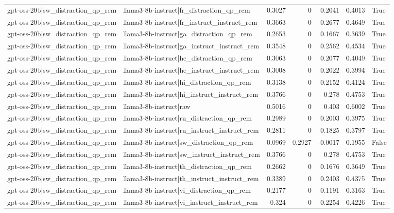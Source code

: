 \begin{table}
\begin{tabular}{l l r r r r l}
gpt-oss-20b|sw_distraction_qp_rem & llama3-8b-instruct|fr_distraction_qp_rem & 0.3027 & 0 & 0.2041 & 0.4013 & True \\
gpt-oss-20b|sw_distraction_qp_rem & llama3-8b-instruct|fr_instruct_instruct_rem & 0.3663 & 0 & 0.2677 & 0.4649 & True \\
gpt-oss-20b|sw_distraction_qp_rem & llama3-8b-instruct|ga_distraction_qp_rem & 0.2653 & 0 & 0.1667 & 0.3639 & True \\
gpt-oss-20b|sw_distraction_qp_rem & llama3-8b-instruct|ga_instruct_instruct_rem & 0.3548 & 0 & 0.2562 & 0.4534 & True \\
gpt-oss-20b|sw_distraction_qp_rem & llama3-8b-instruct|he_distraction_qp_rem & 0.3063 & 0 & 0.2077 & 0.4049 & True \\
gpt-oss-20b|sw_distraction_qp_rem & llama3-8b-instruct|he_instruct_instruct_rem & 0.3008 & 0 & 0.2022 & 0.3994 & True \\
gpt-oss-20b|sw_distraction_qp_rem & llama3-8b-instruct|hi_distraction_qp_rem & 0.3138 & 0 & 0.2152 & 0.4124 & True \\
gpt-oss-20b|sw_distraction_qp_rem & llama3-8b-instruct|hi_instruct_instruct_rem & 0.3766 & 0 & 0.278 & 0.4753 & True \\
gpt-oss-20b|sw_distraction_qp_rem & llama3-8b-instruct|raw & 0.5016 & 0 & 0.403 & 0.6002 & True \\
gpt-oss-20b|sw_distraction_qp_rem & llama3-8b-instruct|ru_distraction_qp_rem & 0.2989 & 0 & 0.2003 & 0.3975 & True \\
gpt-oss-20b|sw_distraction_qp_rem & llama3-8b-instruct|ru_instruct_instruct_rem & 0.2811 & 0 & 0.1825 & 0.3797 & True \\
gpt-oss-20b|sw_distraction_qp_rem & llama3-8b-instruct|sw_distraction_qp_rem & 0.0969 & 0.2927 & -0.0017 & 0.1955 & False \\
gpt-oss-20b|sw_distraction_qp_rem & llama3-8b-instruct|sw_instruct_instruct_rem & 0.3766 & 0 & 0.278 & 0.4753 & True \\
gpt-oss-20b|sw_distraction_qp_rem & llama3-8b-instruct|th_distraction_qp_rem & 0.2662 & 0 & 0.1676 & 0.3649 & True \\
gpt-oss-20b|sw_distraction_qp_rem & llama3-8b-instruct|th_instruct_instruct_rem & 0.3389 & 0 & 0.2403 & 0.4375 & True \\
gpt-oss-20b|sw_distraction_qp_rem & llama3-8b-instruct|vi_distraction_qp_rem & 0.2177 & 0 & 0.1191 & 0.3163 & True \\
gpt-oss-20b|sw_distraction_qp_rem & llama3-8b-instruct|vi_instruct_instruct_rem & 0.324 & 0 & 0.2254 & 0.4226 & True \\

\end{tabular}
\end{table}
